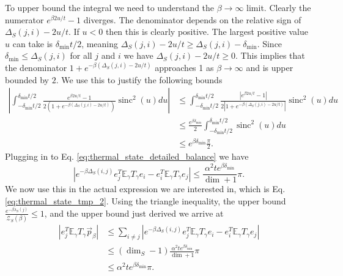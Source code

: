 \documentclass{article}
\newcommand{\abs}[1]{\left| #1 \right|}
\newcommand{\EE}{\mathbb{E}}
\newcommand{\partfun}{\mathcal{Z}}
\DeclareMathOperator{\sinc}{sinc}
\begin{document}
To upper bound the integral we need to understand the $\beta \to \infty$ limit. Clearly the numerator $e^{\beta 2 u /t} - 1$ diverges. The denominator depends on the relative sign of $\Delta_S(j,i) - 2u /t$. If $u < 0$ then this is clearly positive. The largest positive value $u$ can take is $\delta_{\min} t/ 2$, meaning $\Delta_S(j,i) - 2 u / t \geq \Delta_S(j,i) - \delta_{\min}$. Since $\delta_{\min} \leq \Delta_S(j,i)$ for all $j$ and $i$ we have $\Delta_S(j,i) - 2 u /t \geq 0$. This implies that the denominator $1 + e^{-\beta (\Delta_S(j,i) - 2 u /t)}$ approaches 1 as $\beta \to \infty$ and is upper bounded by $2$. We use this to justify the following bounds
\begin{align}
    \abs{\int_{-\delta_{\min}t/2}^{\delta_{\min}t/2} \frac{e^{\beta 2 u /t} - 1}{2(1 + e^{-\beta(\Delta_S(j,i) - 2u/t)})} \sinc^2(u) du} &\leq \int_{-\delta_{\min}t/2}^{\delta_{\min}t/2} \frac{\abs{e^{\beta 2 u / t} - 1}}{2 \abs{1 + e^{-\beta (\Delta_S(j,i) - 2 u / t)}}} \sinc^2(u) du \\
    &\leq \frac{e^{\beta \delta_{\min}}}{2} \int_{-\delta_{\min}t/2}^{\delta_{\min}t/2} \sinc^2(u) du \\
    &\leq e^{\beta \delta_{\min}} \frac{\pi }{2}.
\end{align}
Plugging in to Eq. \eqref{eq:thermal_state_detailed_balance} we have 
\begin{equation}
    \left| e^{-\beta \Delta_S(i ,j)} e_j^T \EE_\gamma T_\gamma e_i - e_i^T \EE_\gamma T_\gamma e_j \right| \leq \frac{\alpha^2 t e^{\beta \delta_{\min}}}{\dim + 1} \pi.
\end{equation}
We now use this in the actual expression we are interested in, which is Eq. \eqref{eq:thermal_state_tmp_2}. Using the triangle inequality, the upper bound $\frac{e^{-\beta \lambda_S(j)}}{\partfun_S(\beta)} \leq 1$, and the upper bound just derived we arrive at
\begin{align}
    \left| e_j^T \EE_\gamma T_\gamma \vec{p}_\beta \right| &\leq \sum_{i \neq j} \left| e^{-\beta \Delta_S(i ,j)} e_j^T \EE_\gamma T_\gamma e_i - e_i^T \EE_\gamma T_\gamma e_j \right| \\
    &\leq (\dim_S - 1) \frac{\alpha^2 t e^{\beta \delta_{\min}}}{\dim + 1} \pi \\
    &\leq \alpha^2 t e^{\beta \delta_{\min}} \pi.
\end{align}
\end{document}
